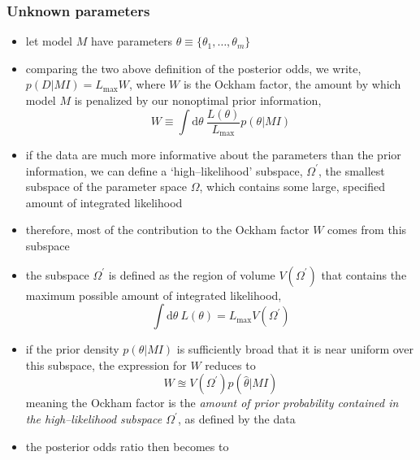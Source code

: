 \documentclass[../jaynes_prob_theory_notes.tex]{subfiles}
\begin{document}
            \subsubsection{Unknown parameters}
                \begin{itemize} 
                    \item let model \(M\) have parameters \(\theta \equiv \{\theta_1, \ldots, \theta_m\}\)
                    \item comparing the two above definition of the posterior odds, we write, \(p(D|MI) = {L}_{\max}W\), where \(W\) is the Ockham factor, the amount by which model \(M\) is penalized by our nonoptimal prior information,
                        \begin{equation*} 
                            W \equiv \int \text{d}\theta~\frac{L(\theta)}{L_{\max}} p(\theta|MI)
                        \end{equation*}
                    \item if the data are much more informative about the parameters than the prior information, we can define a `high--likelihood' subspace, \(\Omega^{\prime}\), the smallest subspace of the parameter space \(\Omega\), which contains some large, specified amount of integrated likelihood
                    \item therefore, most of the contribution to the Ockham factor \(W\) comes from this subspace
                    \item the subspace \(\Omega^{\prime}\) is defined as the region of volume \(V(\Omega^{\prime})\) that contains the maximum possible amount of integrated likelihood,
                        \begin{equation*} 
                            \int \text{d}\theta~L(\theta) = L_{\max}V(\Omega^{\prime})
                        \end{equation*}
                    \item if the prior density \(p(\theta |MI)\) is sufficiently broad that it is near uniform over this subspace, the expression for \(W\) reduces to
                        \begin{equation*} 
                            W \approxeq V(\Omega^{\prime})p(\hat{\theta}|MI)
                        \end{equation*}
                        meaning the Ockham factor is the \textit{amount of prior probability contained in the high--likelihood subspace \(\Omega^{\prime}\)}, as defined by the data
                    \item the posterior odds ratio then becomes to

\end{itemize}
\end{document}
